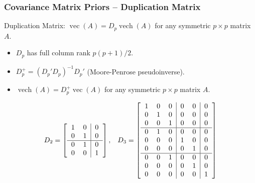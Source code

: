 \documentclass[xcolor=dvipsnames]{beamer}
\DeclareMathOperator{\vech}{vech}
\DeclareMathOperator{\vect}{vec}
\begin{document}
\begin{frame}
\frametitle{Covariance Matrix Priors -- Duplication Matrix}
Duplication Matrix: $\vect(A)=D_p\vech(A)$ for any symmetric $p\times p$ matrix $A$.
\begin{itemize}
\item $D_p$ has full column rank $p(p+1)/2$.
\item $D_p^{+}=(D_p'D_p)^{-1}D_p'$ (Moore-Penrose pseudoinverse).
\item $\vech(A)=D_p^+\vect(A)$ for any symmetric $p\times p$ matrix $A$.
\end{itemize}
\pause\begin{align*}
D_2 = \left[\begin{tabular}{cc|c} 1 & 0 & 0 \\ 0 & 1 &  0 \\\hline 0 & 1 & 0\\ 0 & 0 & 1 \end{tabular}\right], && D_3 =  \left[\begin{tabular}{ccc|cc|c}
1 & 0 & 0 & 0 & 0 & 0 \\ 
0 & 1 & 0 & 0 & 0 & 0 \\ 
0 & 0 & 1 & 0 & 0 & 0 \\\hline
0 & 1 & 0 & 0 & 0 & 0 \\
0 & 0 & 0 & 1 & 0 & 0 \\
0 & 0 & 0 & 0 & 1 & 0 \\\hline
0 & 0 & 1 & 0 & 0 & 0 \\
0 & 0 & 0 & 0 & 1 & 0 \\
0 & 0 & 0 & 0 & 0 & 1
\end{tabular}\right]\\~\\
\end{align*}
\end{frame}
\end{document}
